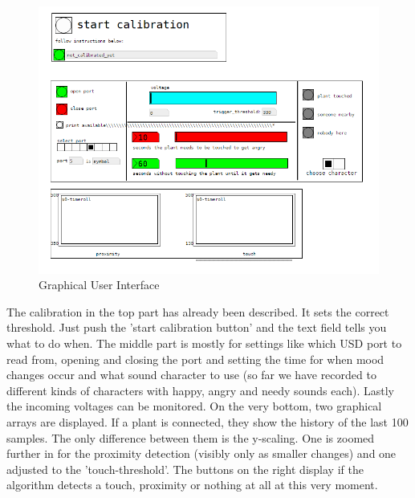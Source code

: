 \begin{figure}[H]
\begin{center}
\includegraphics[width=0.9\linewidth]{Figures/GUI.png}
\caption{Graphical User Interface}
\end{center}
\end{figure}


The calibration in the top part has already been described. It sets the correct threshold. Just push the 'start calibration button' and the text field tells you what to do when.
The middle part is mostly for settings like which USD port to read from, opening and closing the port and setting the time for when mood changes occur and what sound character to use (so far we have recorded to different kinds of characters with happy, angry and needy sounds each). Lastly the incoming voltages can be monitored. On the very bottom, two graphical arrays are displayed. If a plant is connected, they show the history of the last 100 samples. The only difference between them is the y-scaling. One is zoomed further in for the proximity detection (visibly only as smaller changes) and one adjusted to the 'touch-threshold'. The buttons on the right display if the algorithm detects a touch, proximity or nothing at all at this very moment. 





